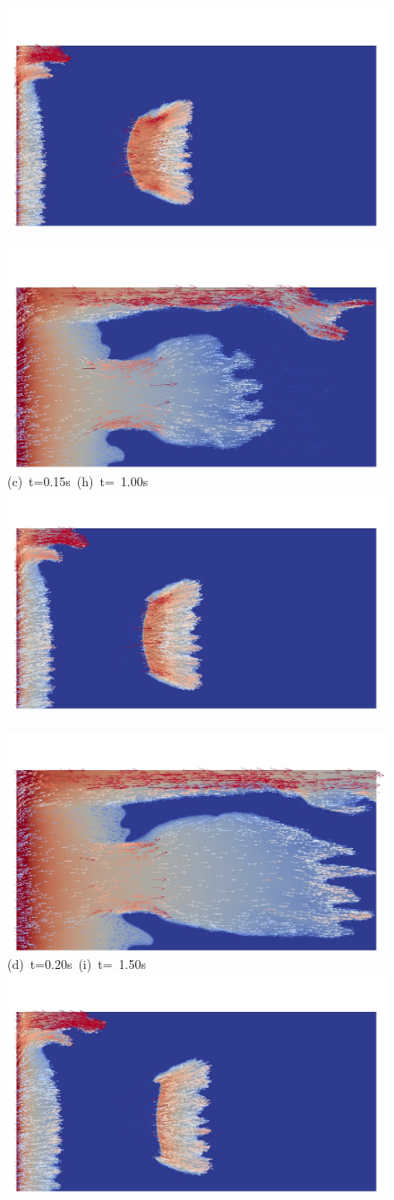 \begin{figure}[ht]
{      \hbox{\includegraphics[width=.45\textwidth]{./Pics1/Section4_4/5r_po_left_inlet_adapt_D150velb.pdf} 
            \includegraphics[width=.45\textwidth]{./Pics1/Section4_4/5r_po_left_inlet_adapt_D1000velb.pdf}}
      \vspace{-.1cm}\hbox{\hspace{2.cm}(c) t=0.15s \hspace{4cm} (h) t= 1.00s}\vspace{-.1cm}
      \hbox{\includegraphics[width=.45\textwidth]{./Pics1/Section4_4/5r_po_left_inlet_adapt_D200velb.pdf} 
            \includegraphics[width=.45\textwidth]{./Pics1/Section4_4/5r_po_left_inlet_adapt_D1500velb.pdf}}
      \vspace{-.1cm}\hbox{\hspace{2.cm}(d) t=0.20s \hspace{4cm} (i) t= 1.50s}\vspace{-.1cm}
      \hbox{\includegraphics[width=.45\textwidth]{./Pics1/Section4_4/5r_po_left_inlet_adapt_D250velb.pdf}}
}
\end{figure}
